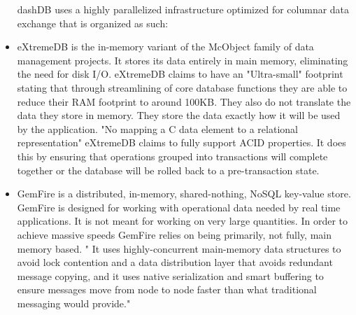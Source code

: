 \documentclass[letterpaper, 12pt]{article}
\begin{document}
\begin{itemize}
	  dashDB uses a highly parallelized infrastructure optimized for columnar data
	  exchange that is organized as such:
	  \par\vspace{\baselineskip}
	  \cite{dashDB}
	  \par\vspace{\baselineskip}
	  \item eXtremeDB is the in-memory variant of the McObject family of data management
	  projects.
	  It stores its data entirely in main memory, eliminating the need for disk I/O. 
	  eXtremeDB claims to have an "Ultra-small" footprint stating that through 
	  streamlining of core database functions they are able to reduce their RAM footprint
	  to around 100KB. They also do not translate the data they store in memory. They 
	  store the data exactly how it will be used by the application. "No mapping a C data
	  element to a relational representation"\cite{extremeDB} eXtremeDB claims to fully 
	  support ACID properties. It does this by ensuring that operations grouped into
	  transactions will complete together or the database will be rolled back to a 
	  pre-transaction state.\cite{extremeDB}
	  \par\vspace{\baselineskip}
	  \cite{extremeDB}
	  \par\vspace{\baselineskip}
	  
	  \item GemFire is a distributed, in-memory, shared-nothing, NoSQL key-value store.
	  GemFire is designed for working with operational data needed by real time 
	  applications. It is not meant for working on very large quantities. In order to 
	  achieve massive speeds GemFire relies on being primarily, not fully, 
	  main memory based. " It uses highly-concurrent main-memory data structures to avoid
	  lock contention and a data distribution
	  layer that avoids redundant message copying, and it uses native serialization and
	  smart buffering to ensure messages move from node to node faster than what
	  traditional messaging would provide."\cite{gemfire}
	  \par\vspace{\baselineskip}
	  \par\vspace{\baselineskip}
	  

\end{itemize}
\end{document}

